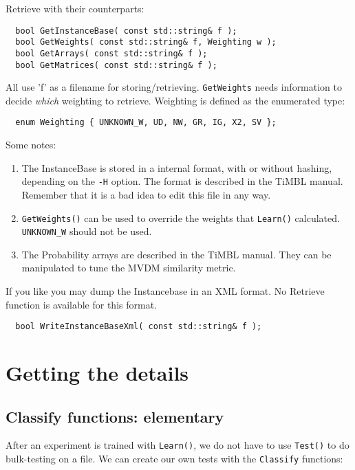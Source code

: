 \documentclass{report}
\begin{document}
Retrieve with their counterparts:

\begin{footnotesize}
\begin{verbatim}
  bool GetInstanceBase( const std::string& f );
  bool GetWeights( const std::string& f, Weighting w );
  bool GetArrays( const std::string& f );
  bool GetMatrices( const std::string& f );
\end{verbatim}
\end{footnotesize}

All use 'f' as a filename for storing/retrieving. {\tt GetWeights} needs
information to decide {\em which}\/ weighting to retrieve.
Weighting is defined as the enumerated type:

\begin{footnotesize}
\begin{verbatim}
  enum Weighting { UNKNOWN_W, UD, NW, GR, IG, X2, SV };
\end{verbatim}
\end{footnotesize}

Some notes:

\begin{enumerate}
\item The InstanceBase is stored in a internal format, with or without
hashing, depending on the {\tt -H} option. The format is described in the
TiMBL manual. Remember that it is a bad idea to edit this file in any way.
\item {\tt GetWeights()} can be used to override the weights that
{\tt Learn()} calculated. {\tt UNKNOWN\_W} should not be used.
\item The Probability arrays are described in the TiMBL manual. They can be
manipulated to tune the MVDM similarity metric.
\end{enumerate}

If you like you may dump the Instancebase in an XML format. No Retrieve
function is available for this format.

\begin{footnotesize}
\begin{verbatim}
  bool WriteInstanceBaseXml( const std::string& f );
\end{verbatim}
\end{footnotesize}

\chapter{Getting the details}

\section{Classify functions: elementary}
After an experiment is trained with {\tt Learn()}, we do not have to use
{\tt Test()} to do bulk-testing on a file.
We can create our own tests with the {\tt Classify} functions:
\end{document}
